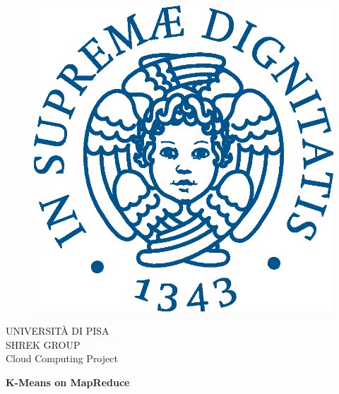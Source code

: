 \begin{titlepage}
    \begin{figure}[!htb]
        \centering
        \includegraphics[keepaspectratio=true,scale=0.5]{images/Frontpage/cherubinFrontespizio.eps}
    \end{figure}
    
    \begin{center}
        \LARGE{UNIVERSITÀ DI PISA}
        \vspace{5mm}
        \\ \Large{SHREK GROUP}
        \vspace{5mm}
        \\ \LARGE{Cloud Computing Project}
    \end{center}
    
    \vspace{15mm}
    \begin{center}
        {\LARGE{\bf K-Means on MapReduce }}
        
        
    \end{center}
    \vspace{30mm}
    

\end{titlepage}
